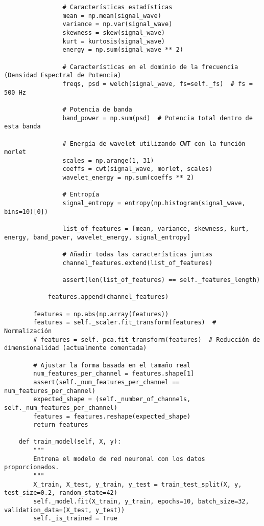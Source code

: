 \documentclass{article}
\begin{document}
\begin{lstlisting}
                # Características estadísticas
                mean = np.mean(signal_wave)
                variance = np.var(signal_wave)
                skewness = skew(signal_wave)
                kurt = kurtosis(signal_wave)
                energy = np.sum(signal_wave ** 2)

                # Características en el dominio de la frecuencia (Densidad Espectral de Potencia)
                freqs, psd = welch(signal_wave, fs=self._fs)  # fs = 500 Hz

                # Potencia de banda
                band_power = np.sum(psd)  # Potencia total dentro de esta banda

                # Energía de wavelet utilizando CWT con la función morlet
                scales = np.arange(1, 31)
                coeffs = cwt(signal_wave, morlet, scales)
                wavelet_energy = np.sum(coeffs ** 2)

                # Entropía
                signal_entropy = entropy(np.histogram(signal_wave, bins=10)[0])

                list_of_features = [mean, variance, skewness, kurt, energy, band_power, wavelet_energy, signal_entropy]

                # Añadir todas las características juntas
                channel_features.extend(list_of_features)
                
                assert(len(list_of_features) == self._features_length)
                
            features.append(channel_features)

        features = np.abs(np.array(features))
        features = self._scaler.fit_transform(features)  # Normalización
        # features = self._pca.fit_transform(features)  # Reducción de dimensionalidad (actualmente comentada)

        # Ajustar la forma basada en el tamaño real
        num_features_per_channel = features.shape[1]
        assert(self._num_features_per_channel == num_features_per_channel)
        expected_shape = (self._number_of_channels, self._num_features_per_channel)
        features = features.reshape(expected_shape)
        return features

    def train_model(self, X, y):
        """
        Entrena el modelo de red neuronal con los datos proporcionados.
        """
        X_train, X_test, y_train, y_test = train_test_split(X, y, test_size=0.2, random_state=42)
        self._model.fit(X_train, y_train, epochs=10, batch_size=32, validation_data=(X_test, y_test))
        self._is_trained = True


\end{lstlisting}
\end{document}
